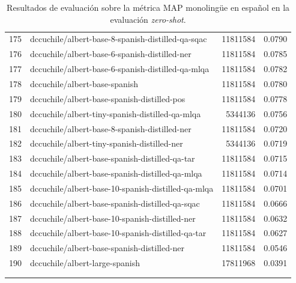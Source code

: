 {\begin{xltabular}{\textwidth}{l X rc}
    175              & dccuchile/albert-base-8-spanish-distilled-qa-sqac                          & 11811584      & 0.0790       \\
    176              & dccuchile/albert-base-6-spanish-distilled-ner                              & 11811584      & 0.0785       \\
    177              & dccuchile/albert-base-6-spanish-distilled-qa-mlqa                          & 11811584      & 0.0782       \\
    178              & dccuchile/albert-base-spanish                                              & 11811584      & 0.0780       \\
    179              & dccuchile/albert-base-spanish-distilled-pos                                & 11811584      & 0.0778       \\
    180              & dccuchile/albert-tiny-spanish-distilled-qa-mlqa                            & 5344136       & 0.0756       \\
    181              & dccuchile/albert-base-8-spanish-distilled-ner                              & 11811584      & 0.0720       \\
    182              & dccuchile/albert-tiny-spanish-distilled-ner                                & 5344136       & 0.0719       \\
    183              & dccuchile/albert-base-spanish-distilled-qa-tar                             & 11811584      & 0.0715       \\
    184              & dccuchile/albert-base-spanish-distilled-qa-mlqa                            & 11811584      & 0.0714       \\
    185              & dccuchile/albert-base-10-spanish-distilled-qa-mlqa                         & 11811584      & 0.0701       \\
    186              & dccuchile/albert-base-spanish-distilled-qa-sqac                            & 11811584      & 0.0666       \\
    187              & dccuchile/albert-base-10-spanish-distilled-ner                             & 11811584      & 0.0632       \\
    188              & dccuchile/albert-base-10-spanish-distilled-qa-tar                          & 11811584      & 0.0627       \\
    189              & dccuchile/albert-base-spanish-distilled-ner                                & 11811584      & 0.0546       \\
    190              & dccuchile/albert-large-spanish                                             & 17811968      & 0.0391       \\
    \hline
    \label{tab:resultados_completos_modelos_zero_shot} \\
    \caption{Resultados de evaluación sobre la métrica \gls{MAP} monolingüe en español en la evaluación \textit{zero-shot}.}
\end{xltabular}
}


